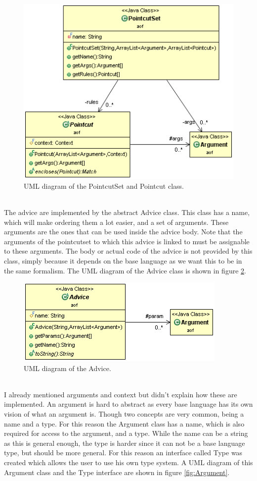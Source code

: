 \documentclass[a4paper]{report}
\begin{document}
\begin{figure}[h!]
\centering
\includegraphics[scale=0.7]{images/AOF/PointcutSet.png}
\caption{UML diagram of the PointcutSet and Pointcut class.}
\label{fig:PointcutSet}
\end{figure}
\\
The advice are implemented by the abstract Advice class. This class has a name, which will make ordering them a lot easier, and a set of arguments. These arguments are the ones that can be used inside the advice body. Note that the arguments of the pointcutset to which this advice is linked to must be assignable to these arguments. The body or actual code of the advice is not provided by this class, simply because it depends on the base language as we want this to be in the same formalism. The UML diagram of the Advice class is shown in figure \ref{fig:Advice}.\\
\begin{figure}[h!]
\centering
\includegraphics[scale=0.7]{images/AOF/Advice.png}
\caption{UML diagram of the Advice.}
\label{fig:Advice}
\end{figure}
\\
I already mentioned arguments and context but didn't explain how these are implemented. An argument is hard to abstract as every base language has its own vision of what an argument is. Though two concepts are very common, being a name and a type. For this reason the Argument class has a name, which is also required for access to the argument, and a type. While the name can be a string as this is general enough, the type is harder since it can not be a base language type, but should be more general. For this reason an interface called Type was created which allows the user to use his own type system. A UML diagram of this Argument class and the Type interface are shown in figure \ref{fig:Argument}.\\
\end{document}
